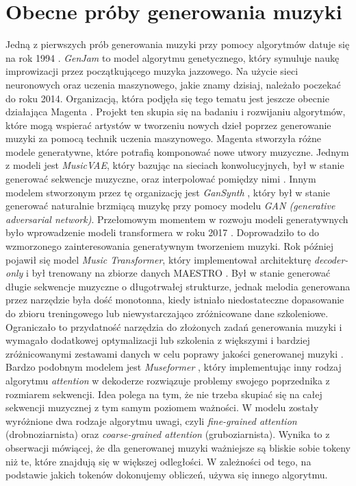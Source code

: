 \documentclass[data-science]{agh-wi} %
\begin{document}
\section{Obecne próby generowania muzyki}
Jedną z pierwszych prób generowania muzyki przy pomocy algorytmów datuje się na rok 1994 \cite{GenJam}. \textit{GenJam} to model algorytmu genetycznego, który symuluje naukę improwizacji przez początkującego muzyka jazzowego. Na użycie sieci neuronowych oraz uczenia maszynowego, jakie znamy dzisiaj, należało poczekać do roku 2014. Organizacją, która podjęła się tego tematu jest jeszcze obecnie działająca Magenta \cite*{magenta}. Projekt ten skupia się na badaniu i rozwijaniu algorytmów, które mogą wspierać artystów w tworzeniu nowych dzieł poprzez generowanie muzyki za pomocą technik uczenia maszynowego. Magenta stworzyła różne modele generatywne, które potrafią komponować nowe utwory muzyczne. Jednym z modeli jest \textit{MusicVAE}, który bazując na sieciach konwolucyjnych, był w stanie generować sekwencje muzyczne, oraz interpolować pomiędzy nimi \cite*{musicvae}. Innym modelem stworzonym przez tę organizację jest \textit{GanSynth} \cite*{engel2018gansynth}, który był w stanie generować naturalnie brzmiącą muzykę przy pomocy modelu \textit{GAN (generative adversarial network)}. Przełomowym momentem w rozwoju modeli generatywnych było wprowadzenie modeli transformera w roku 2017 \cite*{attention}. Doprowadziło to do wzmorzonego zainteresowania generatywnym tworzeniem muzyki. Rok później pojawił się model \textit{Music Transformer}, który implementował architekturę \textit{decoder-only} i był trenowany na zbiorze danych MAESTRO \cite*{huang2018music}. Był w stanie generować długie sekwencje muzyczne o długotrwałej strukturze, jednak melodia generowana przez narzędzie była dość monotonna, kiedy istniało niedostateczne dopasowanie do zbioru treningowego lub niewystarczająco zróżnicowane dane szkoleniowe. Ograniczało to przydatność narzędzia do złożonych zadań generowania muzyki i wymagało dodatkowej optymalizacji lub szkolenia z większymi i bardziej zróżnicowanymi zestawami danych w celu poprawy jakości generowanej muzyki \cite*{zhu2023survey}. Bardzo podobnym modelem jest \textit{Museformer} \cite*{yu2022museformer}, który implementując inny rodzaj algorytmu \textit{attention} w dekoderze rozwiązuje problemy swojego poprzednika z rozmiarem sekwencji. Idea polega na tym, że nie trzeba skupiać się na całej sekwencji muzycznej z tym samym poziomem ważności. W modelu zostały wyróżnione dwa rodzaje algorytmu uwagi, czyli \textit{fine-grained attention} (drobnoziarnista) oraz \textit{coarse-grained attention} (gruboziarnista). Wynika to z obserwacji mówiącej, że dla generowanej muzyki ważniejsze są bliskie sobie tokeny niż te, które znajdują się w większej odległości. W zależności od tego, na podstawie jakich tokenów dokonujemy obliczeń, używa się innego algorytmu.
\end{document}
